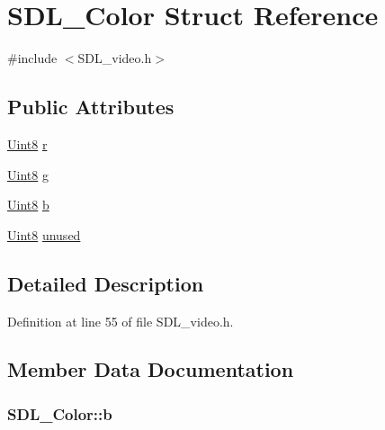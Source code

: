 \hypertarget{struct_s_d_l___color}{}\section{S\+D\+L\+\_\+\+Color Struct Reference}
\label{struct_s_d_l___color}


{\ttfamily \#include $<$S\+D\+L\+\_\+video.\+h$>$}

\subsection*{Public Attributes}
\begin{DoxyCompactItemize}
\item 
\hyperlink{_s_d_l__stdinc_8h_a2944638813a090aa23e62f4da842c3e2}{Uint8} \hyperlink{struct_s_d_l___color_a0bb975b6829524133fdd3c6060cfa63d}{r}
\item 
\hyperlink{_s_d_l__stdinc_8h_a2944638813a090aa23e62f4da842c3e2}{Uint8} \hyperlink{struct_s_d_l___color_ae29d881bf740cfa7078b36e07f85d298}{g}
\item 
\hyperlink{_s_d_l__stdinc_8h_a2944638813a090aa23e62f4da842c3e2}{Uint8} \hyperlink{struct_s_d_l___color_a3b79a27e0414049559aa5bcf241dedd3}{b}
\item 
\hyperlink{_s_d_l__stdinc_8h_a2944638813a090aa23e62f4da842c3e2}{Uint8} \hyperlink{struct_s_d_l___color_a72c141f474a236dd0e881a4167783e2e}{unused}
\end{DoxyCompactItemize}


\subsection{Detailed Description}


Definition at line 55 of file S\+D\+L\+\_\+video.\+h.



\subsection{Member Data Documentation}
\hypertarget{struct_s_d_l___color_a3b79a27e0414049559aa5bcf241dedd3}{}
\subsubsection[{b}]{ S\+D\+L\+\_\+\+Color\+::b}\label{struct_s_d_l___color_a3b79a27e0414049559aa5bcf241dedd3}


